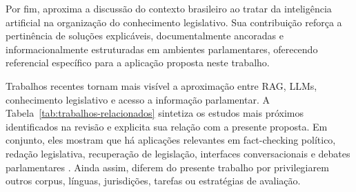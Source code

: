 Por fim, \textcite{martelloteViola2025organizacaoConhecimento} aproxima a discussão do contexto brasileiro ao tratar da inteligência artificial na organização do conhecimento legislativo. Sua contribuição reforça a pertinência de soluções explicáveis, documentalmente ancoradas e informacionalmente estruturadas em ambientes parlamentares, oferecendo referencial específico para a aplicação proposta neste trabalho.

Trabalhos recentes tornam mais visível a aproximação entre RAG, LLMs, conhecimento legislativo e acesso a informação parlamentar. A Tabela~\ref{tab:trabalhos-relacionados} sintetiza os estudos mais próximos identificados na revisão e explicita sua relação com a presente proposta. Em conjunto, eles mostram que há aplicações relevantes em fact-checking político, redação legislativa, recuperação de legislação, interfaces conversacionais e debates parlamentares \parencite{khaliq2024ragar,chouhanGertz2024lexdrafter,rogiersEtAl2024kamerraad,matoshiEtAl2025parliamentRag,garrisonEtAl2024talkNdaa,colombo2024legisAi,colomboEtAl2025legisSearch,mosbachEtAl2025worldAvatarParliament,sarnikar2025legislativeTexts}. Ainda assim, diferem do presente trabalho por privilegiarem outros corpus, línguas, jurisdições, tarefas ou estratégias de avaliação.

